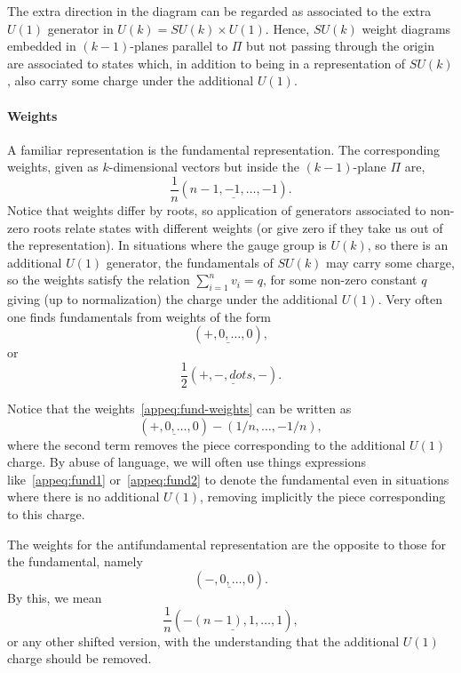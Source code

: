 The extra direction in the diagram can be regarded as associated to the extra $U(1)$ generator in $U(k) = SU(k) \times U(1)$. Hence, $SU(k)$ weight diagrams embedded in $(k-1)$-planes parallel to $\Pi$ but not passing through the origin are associated to states which, in addition to being in a representation of $SU(k)$, also carry some charge under the additional $U(1)$.

\paragraph{Weights}
A familiar representation is the fundamental representation. The corresponding weights, given as $k$-dimensional vectors but inside the $(k-1)$-plane $\Pi$ are,
\begin{equation}\label{appeq:fund-weights}
    \frac{1}{n} (\underline{n-1, -1, \dots, -1}) .
\end{equation}
Notice that weights differ by roots, so application of generators associated to non-zero roots relate states with different weights (or give zero if they take us out of the representation).
In situations where the gauge group is $U(k)$, so there is an additional $U(1)$ generator, the fundamentals of $SU(k)$ may carry some charge, so the weights satisfy the relation $\sum_{i=1}^n v_i = q$, for some non-zero constant $q$ giving (up to normalization) the charge under the additional $U(1)$. Very often one finds fundamentals from weights of the form
\begin{equation}\label{appeq:fund1}
    (\underline{+,0,\dots,0}),
\end{equation}
or
\begin{equation}\label{appeq:fund2}
    \frac{1}{2} (\underline{+,-,dots,-}).
\end{equation}

Notice that the weights~\eqref{appeq:fund-weights} can be written as
\begin{equation}
    (\underline{+,0,\dots,0}) - (1/n, \dots, -1/n),
\end{equation}
where the second term removes the piece corresponding to the additional $U(1)$ charge. By abuse of language, we will often use things expressions like~\eqref{appeq:fund1} or~\eqref{appeq:fund2} to denote the fundamental even in situations where there is no additional $U(1)$, removing implicitly the piece corresponding to this charge.

The weights for the antifundamental representation are the opposite to those for the fundamental, namely
\begin{equation}
    (\underline{-,0,\dots,0}).
\end{equation}
By this, we mean
\begin{equation}
    \frac{1}{n} (\underline{-(n-1),1,\dots,1}),
\end{equation}
or any other shifted version, with the understanding that the additional $U(1)$ charge should be removed.

